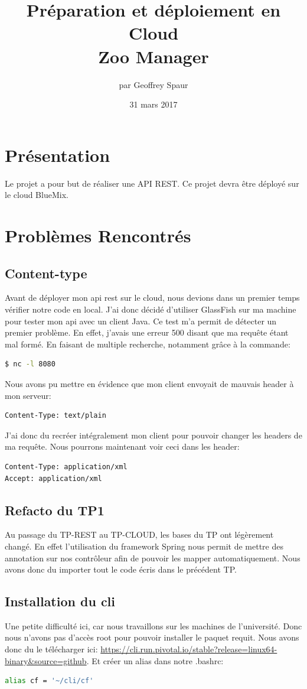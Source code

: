 \documentclass{article}
\title{Préparation et déploiement en Cloud \\ Zoo Manager}
\author{par Geoffrey Spaur}
\date{31 mars 2017}
\begin{document}
\maketitle
\newpage
\tableofcontents{}
\newpage
\section{Présentation}
	Le projet a pour but de réaliser une API REST. Ce projet devra être déployé sur le cloud BlueMix. 
	
\section{Problèmes Rencontrés}

\subsection{Content-type}
Avant de déployer mon api rest sur le cloud, nous devions dans un premier temps vérifier notre code en local. J'ai donc décidé d'utiliser GlassFish sur ma machine pour tester mon api avec un client Java. Ce test m'a permit de détecter un premier problème. En effet, j'avais une erreur 500 disant que ma requête étant mal formé. En faisant de multiple recherche, notamment grâce à la commande:
\begin{lstlisting}[language=bash]
$ nc -l 8080
\end{lstlisting}
Nous avons pu mettre en évidence que mon client envoyait de mauvais header à mon serveur: 
\begin{lstlisting}
Content-Type: text/plain
\end{lstlisting}
J'ai donc du recréer intégralement mon client pour pouvoir changer les headers de ma requête. Nous pourrons maintenant voir ceci dans les header:
\begin{lstlisting}
Content-Type: application/xml
Accept: application/xml
\end{lstlisting}

\subsection{Refacto du TP1}
Au passage du TP-REST au TP-CLOUD, les bases du TP ont légèrement changé.
En effet l'utilisation du framework Spring nous permit de mettre des annotation sur nos contrôleur afin de pouvoir les mapper automatiquement. Nous avons donc du importer tout le code écris dans le précédent TP.

\subsection{Installation du cli}
Une petite difficulté ici, car nous travaillons sur les machines de l'université. Donc nous n'avons pas d'accès root pour pouvoir installer le paquet requit. Nous avons donc du le télécharger ici: \url{https://cli.run.pivotal.io/stable?release=linux64-binary&source=github}. Et créer un alias dans notre .bashrc:
\begin{lstlisting}[language=bash]
alias cf = '~/cli/cf'
\end{lstlisting}
\end{document}

